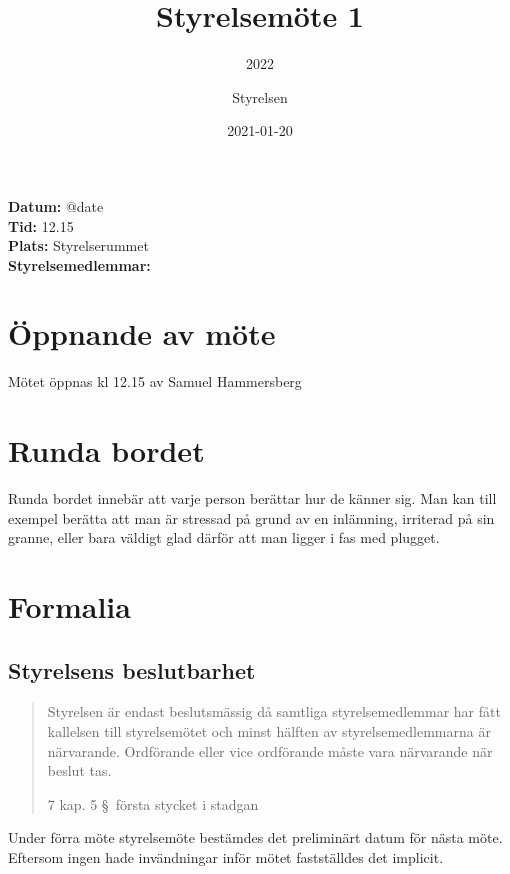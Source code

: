 \documentclass[protokoll]{dvd}
\begin{document}
\title{Styrelsemöte 1}
\subtitle{2022}
\author{Styrelsen}
\date{2021-01-20}

\textbf{Datum:} \csname @date\endcsname\\
\textbf{Tid:} 12.15\\
\textbf{Plats:} Styrelserummet\\
\textbf{Styrelsemedlemmar:}
\begin{närvarande_förtroendevalda}
\end{närvarande_förtroendevalda}


\section{Öppnande av möte}

Mötet öppnas kl 12.15 av Samuel Hammersberg

\section{Runda bordet}

    Runda bordet innebär att varje person berättar hur de känner sig.
    Man kan till exempel berätta att man är stressad på grund av en inlämning, irriterad på sin granne, eller bara väldigt glad därför att man ligger i fas med plugget.

\section{Formalia}

    \subsection{Styrelsens beslutbarhet}

        \blockquote[7 kap. 5 \S~första stycket i stadgan][]{
            Styrelsen är endast beslutsmässig då samtliga styrelsemedlemmar har fått kallelsen till styrelsemötet och minst hälften av styrelsemedlemmarna är närvarande.
            Ordförande eller vice ordförande måste vara närvarande när beslut tas.
        }

        Under förra möte styrelsemöte bestämdes det preliminärt datum för nästa möte. Eftersom ingen hade invändningar inför mötet fastställdes det implicit. 
\end{document}

